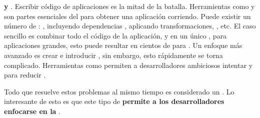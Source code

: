 \begin{itemize}
		\textbf{\buildingPL y \packagingCPT}. Escribir código de aplicaciones \isomorphicAS es la mitad de la batalla. Herramientas como \grunttoolNAME y \browserifyNAME son partes esenciales del \workflowCPT para obtener una aplicación corriendo. Puede existir un número de \buildStepsPL: \compilingPL \templatesAS, incluyendo dependencias \clientSideAS, aplicando transformaciones, \minificationPL, etc. El caso sencillo es combinar todo el código de la aplicación, \viewsAS y \templatesAS en un único \bundleCPT, para aplicaciones grandes, esto puede resultar en cientos de \kilobytesPC para \downloadCPT. Un enfoque más avanzado es crear \dynamicBundlesCPT e introducir \lazyLoadingCPT \assetsAS, sin embargo, esto rápidamente se torna complicado. Herramientas \statAnalyCPT como \esprimaNAME permiten a desarrolladores ambiciosos intentar \optimizationQA y \metaprogrammingPC para reducir \boilerplateCodeAS.
\end{itemize}

Todo \frameworkPC que resuelve estos problemas al mismo tiempo es considerado un \isomorphicJSFwASref. Lo interesante de esto es que este tipo de \frameworksPC \textbf{permite a los desarrolladores enfocarse en la \businessLogicAS}.



